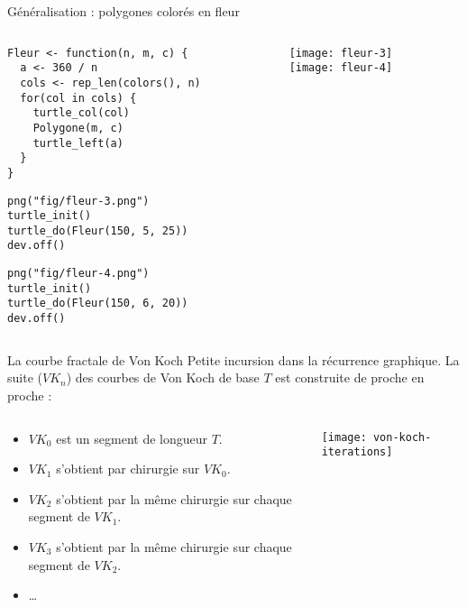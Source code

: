 \documentclass[10pt]{beamer}
\begin{document}
\begin{frame}[fragile]{Généralisation : polygones colorés en fleur}

\begin{columns}[c]
\begin{column}{0.58\textwidth}
  \begin{lstlisting}[style=editor]
Fleur <- function(n, m, c) {
  a <- 360 / n
  cols <- rep_len(colors(), n)
  for(col in cols) {
    turtle_col(col)
    Polygone(m, c)
    turtle_left(a)
  }
}
\end{lstlisting}

\begin{lstlisting}[linerange=2-3]
png("fig/fleur-3.png")
turtle_init()
turtle_do(Fleur(150, 5, 25))
dev.off()
\end{lstlisting}


\begin{lstlisting}[linerange=2-3]
png("fig/fleur-4.png")
turtle_init()
turtle_do(Fleur(150, 6, 20))
dev.off()
\end{lstlisting}

\end{column}

\begin{column}{0.38\textwidth}
  \texttt{[image: fleur-3]}
  \\
  \texttt{[image: fleur-4]}
\end{column}
\end{columns}
\end{frame}

\begin{frame}{La courbe fractale de Von Koch}
  Petite incursion dans la récurrence graphique. La suite ($VK_n $) des courbes de Von Koch de base $T$ est construite de proche en proche :


\begin{columns}[c]
\begin{column}{0.58\textwidth}
  \begin{itemize}
\item $VK_0$ est un segment de longueur $T$.
\item $VK_1$ s'obtient par chirurgie sur $VK_0$.
\item $VK_2$ s'obtient par la même chirurgie sur chaque segment de $VK_1$.
\item $VK_3$ s'obtient par la même chirurgie sur chaque segment de $VK_2$.
\item \dots

\end{itemize}
\end{column}
\begin{column}{0.38\textwidth}
  \texttt{[image: von-koch-iterations]}
\end{column}
\end{columns}
\end{frame}
\end{document}
